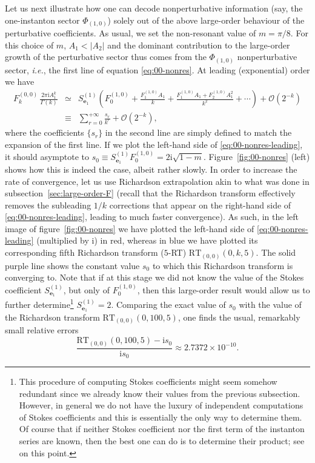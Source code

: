 \documentclass[11pt,a4paper]{article}
\newcommand{\be}{\begin{equation}}
\newcommand{\ee}{\end{equation}}
\begin{document}
Let us next illustrate how one can decode nonperturbative information (say, the one-instanton sector $\Phi_{(1,0)}$) solely out of the above large-order behaviour of the perturbative coefficients. As usual, we set the non-resonant value of $m=\pi/8$. For this choice of $m$, $A_1<|A_2|$ and the dominant contribution to the large-order growth of the perturbative sector thus comes from the $\Phi_{(1,0)}$ nonperturbative sector, \textit{i.e.}, the first line of equation \eqref{eq:00-nonres}. At leading (exponential) order we have
%
\begin{eqnarray}
\label{eq:00-nonres-leading}
F_{k}^{(0,0)}\, \frac{2\pi\mathrm{i} A_1^k}{\Gamma(k)} &\simeq& S^{(1)}_{\boldsymbol{e}_1} \left( F^{(1,0)}_0 + \frac{F^{(1,0)}_1 A_1}{k} + \frac{F^{(1,0)}_1 A_1 + F^{(1,0)}_2 A_1^2}{k^2} + \cdots \right) + \mathcal{O}(2^{-k}) \\
&\equiv&
\sum_{r=0}^{+\infty} \frac{s_r}{k^r} + \mathcal{O}(2^{-k}),
\end{eqnarray}
% 
\noindent
where the coefficients $\{ s_r \}$ in the second line are simply defined to match the expansion of the first line. If we plot the left-hand side of \eqref{eq:00-nonres-leading}, it should asymptote to $s_0 \equiv S^{(1)}_{\boldsymbol{e}_1} F^{(1,0)}_0 = 2\mathrm{i}\sqrt{1-m}$. Figure~\ref{fig:00-nonres} (left) shows how this is indeed the case, albeit rather slowly. In order to increase the rate of convergence, let us use Richardson extrapolation akin to what was done in subsection~\ref{sec:large-order-F} (recall that the Richardson transform effectively removes the subleading $1/k$ corrections that appear on the right-hand side of \eqref{eq:00-nonres-leading}, leading to much faster convergence). As such, in the left image of figure~\ref{fig:00-nonres} we have plotted the left-hand side of \eqref{eq:00-nonres-leading} (multiplied by $\mathrm{i}$) in red, whereas in blue we have plotted its corresponding fifth Richardson transform ($5$-RT) $\mathrm{RT}_{(0,0)}(0,k,5)$. The solid purple line shows the constant value $s_0$ to which this Richardson transform is converging to. Note that if at this stage we did not know the value of the Stokes coefficient $S^{(1)}_{\boldsymbol{e}_1}$, but only of $F^{(1,0)}_0$, then this large-order result would allow us to further determine\footnote{This procedure of computing Stokes coefficients might seem somehow redundant since we already know their values from the previous subsection. However, in general we do not have the luxury of independent computations of Stokes coefficients and this is essentially the only way to determine them. Of course that if neither Stokes coefficient nor the first term of the instanton series are known, then the best one can do is to determine their product; see \cite{asv11} on this point.} $S^{(1)}_{\boldsymbol{e}_1} = 2$. Comparing the exact value of $s_0$ with the value of the Richardson transform $\mathrm{RT}_{(0,0)}(0,100,5)$, one finds the usual, remarkably small relative errors
%
\be
\frac{\mathrm{RT}_{(0,0)} (0,100,5) - \mathrm{i} s_0}{\mathrm{i} s_0} \approx 2.7372 \times 10^{-10}.
\ee
\end{document}
